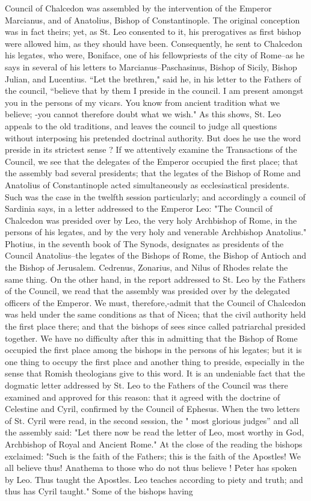 Council of Chalcedon was assembled by the intervention of the Emperor Marcianus, and of Anatolius, Bishop of Constantinople. The original conception was in fact theirs; yet, as St. Leo consented to it, his prerogatives as first bishop were allowed him, as they should have been. Consequently, he sent to Chalcedon his legates, who were, Boniface, one of his fellowpriests of the city of Rome--as he says in several of his letters to Marcianus--Paschasinus, Bishop of Sicily, Bishop Julian, and Lucentius. “Let the brethren," said he, in his letter to the Fathers of the council, “believe that by them I preside in the council. I am present amongst you in the persons of my vicars. You know from ancient tradition what we believe; -you cannot therefore doubt what we wish." As this shows, St. Leo appeals to the old traditions, and leaves the council to judge all questions without interposing his pretended doctrinal authority. But does he use the word preside in its strictest sense ? If we attentively examine the Transactions of the Council, we see that the delegates of the Emperor occupied the first place; that the assembly bad several presidents; that the legates of the Bishop of Rome and Anatolius of Constantinople acted simultaneously as ecclesiastical presidents. Such was the case in the twelfth session particularly; and accordingly a council of Sardinia says, in a letter addressed to the Emperor Leo: "The Council of Chalcedon was presided over by Leo, the very holy Archbishop of Rome, in the persons of his legates, and by the very holy and venerable Archbishop Anatolius." Photius, in the seventh book of The Synods, designates as presidents of the Council Anatolius--the legates of the Bishops of Rome, the Bishop of Antioch and the Bishop of Jerusalem. Cedrenus, Zonarius, and Nilus of Rhodes relate the same thing. On the other hand, in the report addressed to St. Leo by the Fathers of the Council, we read that the assembly was presided over by the delegated officers of the Emperor. We must, therefore,-admit that the Council of Chalcedon was held under the same conditions as that of Nicea; that the civil authority held the first place there; and that the bishops of sees since called patriarchal presided together. We have no difficulty after this in admitting that the Bishop of Rome occupied the first place among the bishops in the persons of his legates; but it is one thing to occupy the first place and another thing to preside, especially in the sense that Romish theologians give to this word. It is an undeniable fact that the dogmatic letter addressed by St. Leo to the Fathers of the Council was there examined and approved for this reason: that it agreed with the doctrine of Celestine and Cyril, confirmed by the Council of Ephesus. When the two letters of St. Cyril were read, in the second session, the " most glorious judges” and all the assembly said: "Let there now be read the letter of Leo, most worthy in God, Archbishop of Royal and Ancient Rome." At the close of the reading the bishops exclaimed: "Such is the faith of the Fathers; this is the faith of the Apostles! We all believe thus! Anathema to those who do not thus believe ! Peter has spoken by Leo. Thus taught the Apostles. Leo teaches according to piety and truth; and thus has Cyril taught." Some of the bishops having 